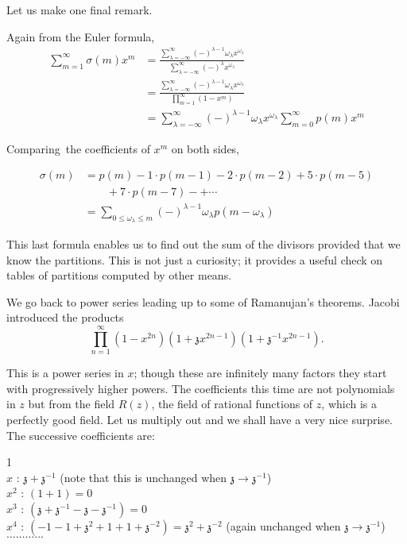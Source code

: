 Let us make one final remark.

Again from the Euler formula,
\begin{align*}
  \sum^\infty_{m=1} \sigma(m) x^m & = \frac{\sum\limits^\infty_{\lambda
    =-\infty} (-)^{\lambda-1} \omega_\lambda x
    ^{\omega_\lambda}}{\sum\limits^\infty_{\lambda =-\infty}
    (-)^\lambda x^{\omega_\lambda}}\\
  & = \frac{\sum\limits^\infty_{\lambda
    =-\infty} (-)^{\lambda-1} \omega_\lambda x
    ^{\omega_\lambda}}{\prod\limits^\infty_{m=1} (1- x^m)}\\
  &= \sum\limits^\infty_{\lambda
    =-\infty} (-)^{\lambda-1} \omega_\lambda x^{\omega_\lambda}
  \sum^\infty_{m=0} p(m) x^m
\end{align*}

Comparing\pageoriginale\  the coefficients of $x^m$ on both sides,

\begin{align*}
  \sigma(m) & = p(m) - 1\cdot p(m-1) - 2\cdot p(m-2) + 5 \cdot p(m-5)\\
&\qquad + 7\cdot p(m-7) - + \cdots\\
  & = \sum_{0 \leq \omega_\lambda \leq m} (-)^{\lambda-1}
  \omega_\lambda p(m-\omega_\lambda)
\end{align*}

This last formula enables us to find out the sum of the divisors
provided that we know the partitions. This is not just a curiosity; it
provides a useful check on tables of partitions computed by other
means. 

We go back to power series leading up to some of Ramanujan's
theorems. Jacobi introduced the products
$$
\prod^\infty_{n=1} (1-x^{2n})(1+ \mathfrak{z}x^{2n-1}) (1+
\mathfrak{z}^{-1} x^{2n-1}).
$$

This is a power series in $x$; though these are infinitely many
factors they start with progressively higher powers. The coefficients
this time are not polynomials in $z$ but from the field $R(z)$, the
field of rational functions of $z$, which is a perfectly good
field. Let us multiply out and we shall have a very nice surprise. The
successive coefficients are:

\begin{tabbing}
  1 \quad \= \\
  $x$ \>:  $\mathfrak{z}+  \mathfrak{z}^{-1}$ \qquad (note that this
  is unchanged when $ \mathfrak{z}\to  \mathfrak{z}^{-1}$)\\
  $x^2$ \> : $(1+1)=0$\\
  $x^3$ \> : $(\mathfrak{z} + \mathfrak{z}^{-1}-  \mathfrak{z}-
  \mathfrak{z}^{-1})=0$\\
  $x^4$ \> : $(-1-1+ \mathfrak{z}^2+1+1+ \mathfrak{z}^{-2})=
  \mathfrak{z}^2+ \mathfrak{z}^{-2}$ (again unchanged when
  $\mathfrak{z} \to  \mathfrak{z}^{-1}$)\\
  \> $\dots \dots \dots \dots $
\end{tabbing}

